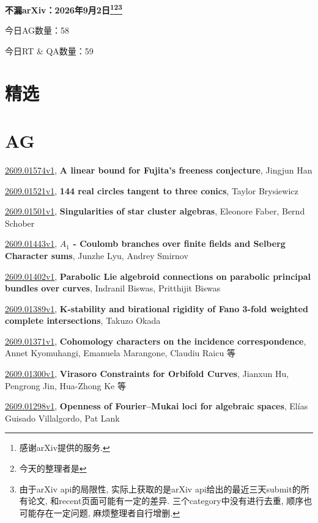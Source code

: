 \documentclass[9pt, a4paper]{article}
\theoremstyle{plain}
\theoremstyle{definition}
\theoremstyle{remark}
\newcommand{\arxiv}[3]{\href{https://arxiv.org/abs/#1}{#1}, \textbf{\textcolor{arxivblue}{#2}}, #3}
\newcommand{\AGnumber}{58}
\newcommand{\RTQAnumber}{59}
\newcommand{\NewestDate}{2026年9月2日}
\newcommand{\todayarXiver}{} %
\begin{document}
\begin{center}
    \Huge\textbf{不漏arXiv：\NewestDate\footnote{感谢arXiv提供的服务.}\footnote{今天的整理者是\todayarXiver}\footnote{由于arXiv api的局限性, 实际上获取的是arXiv api给出的最近三天submit的所有论文, 和recent页面可能有一定的差异. 三个category中没有进行去重, 顺序也可能存在一定问题, 麻烦整理者自行增删.}} \\
\end{center}

\setcounter{section}{-1}

\begin{center}
    今日AG数量：\AGnumber
    
    今日RT \& QA数量：\RTQAnumber
    
\end{center}


\section{精选}


\section{AG}
\arxiv{2609.01574v1}{A linear bound for Fujita's freeness conjecture}{Jingjun Han}

\arxiv{2609.01521v1}{144 real circles tangent to three conics}{Taylor Brysiewicz}

\arxiv{2609.01501v1}{Singularities of star cluster algebras}{Eleonore Faber, Bernd Schober}

\arxiv{2609.01443v1}{$A_1$ - Coulomb branches over finite fields and Selberg Character sums}{Junzhe Lyu, Andrey Smirnov}

\arxiv{2609.01402v1}{Parabolic Lie algebroid connections on parabolic principal bundles over curves}{Indranil Biswas, Pritthijit Biswas}

\arxiv{2609.01389v1}{K-stability and birational rigidity of Fano 3-fold weighted complete intersections}{Takuzo Okada}

\arxiv{2609.01371v1}{Cohomology characters on the incidence correspondence}{Annet Kyomuhangi, Emanuela Marangone, Claudiu Raicu 等}

\arxiv{2609.01300v1}{Virasoro Constraints for Orbifold Curves}{Jianxun Hu, Pengrong Jin, Hua-Zhong Ke 等}

\arxiv{2609.01298v1}{Openness of Fourier--Mukai loci for algebraic spaces}{Elías Guisado Villalgordo, Pat Lank}
\end{document}
